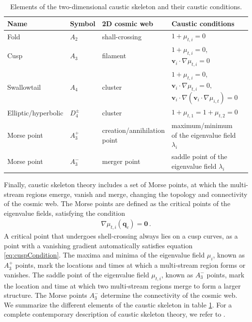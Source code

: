 \documentclass[a4paper, 11pt]{article}
\begin{document}
\begin{table}
\centering
{\scriptsize
\begin{tabular}{ |l | l | l | l | l|}
\hline
\textbf{Name} & \textbf{Symbol} & \textbf{2D cosmic web} & \textbf{Caustic conditions}\\
\hline
Fold & $A_2$ & shall-crossing & $1+ \mu_{t,i} = 0$ \\
\hline
Cusp & $A_3$ & filament & $1+ \mu_{t,i} = 0$, $\bm{v}_i \cdot \nabla \mu_{t,i} = 0$\\
\hline
Swallowtail &$A_4$ &  cluster & $1+ \mu_{t,i} = 0$, $\bm{v}_i \cdot \nabla \mu_{t,i} = 0,$ $\bm{v}_i \cdot \nabla(\bm{v}_i \cdot \nabla \mu_{i,t}) = 0$\\
\hline
Elliptic/hyperbolic & $D_4^{\pm}$ & cluster & $1+ \mu_{t,1} = 1+ \mu_{t,2} = 0$\\
\hline
Morse point & $A_3^+$ & creation/annihilation point& maximum/minimum of the eigenvalue field $\lambda_i$\\
\hline
Morse point & $A_3^-$ & merger point & saddle point of the eigenvalue field $\lambda_i$\\
\hline
\end{tabular}
}
\caption{Elements of the two-dimensional caustic skeleton and their caustic conditions.}
\label{table:caustics}
\end{table}



Finally, caustic skeleton theory includes a set of Morse points, at which the multi-stream regions emerge, vanish and merge, changing the topology and connectivity of the cosmic web. The Morse points are defined as the critical points of the eigenvalue fields, satisfying the condition
\begin{align}
\nabla \mu_{t,i}(\bm{q}_c)=\bm{0}\,.
\end{align}
A critical point that undergoes shell-crossing always lies on a cusp curves, as a point with a vanishing gradient automatically satisfies equation \eqref{eq:cuspCondition}. The maxima and minima of the eigenvalue field $\mu_i$, known as $A_3^+$ points, mark the locations and times at which a multi-stream region forms or vanishes. The saddle point of the eigenvalue field $\mu_{t,i}$, known as $A_3^-$ points, mark the location and time at which two multi-stream regions merge to form a larger structure. The Morse points $A_3^-$ determine the connectivity of the cosmic web. We summarize the different elements of the caustic skeleton in table \ref{table:caustics}. For a complete contemporary description of caustic skeleton theory, we refer to \cite{Hidding:2014, Feldbrugge:2018}. 
\end{document}
